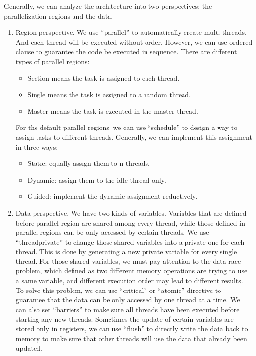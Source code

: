 {Generally, we can analyze the architecture into two perspectives: the parallelization regions and the data.
\begin{enumerate}
	\item Region perspective.
	We use “parallel” to automatically create multi-threads. And each thread will be executed without order. However, we can use ordered clause to guarantee the code be executed in sequence. There are different types of parallel regions:
	\begin{itemize}
		\item Section means the task is assigned to each thread.
		\item Single means the task is assigned to a random thread.
		\item Master means the task is executed in the master thread.
	\end{itemize}
	For the default parallel regions, we can use “schedule” to design a way to assign tasks to different threads. Generally, we can implement this assignment in three ways:
	\begin{itemize}
		\item Static: equally assign them to n threads.
		\item Dynamic: assign them to the idle thread only.
		\item Guided: implement the dynamic assignment reductively.
	\end{itemize}
	\item Data perspective.
	We have two kinds of variables. Variables that are defined before parallel region are shared among every thread, while those defined in parallel regions can be only accessed by certain threads. We use “threadprivate” to change those shared variables into a private one for each thread. This is done by generating a new private variable for every single thread. For those shared variables, we must pay attention to the data race problem, which defined as two different memory operations are trying to use a same variable, and different execution order may lead to different results. To solve this problem, we can use “critical” or “atomic” directive to guarantee that the data can be only accessed by one thread at a time. We can also set “barriers” to make sure all threads have been executed before starting any new threads. Sometimes the update of certain variables are stored only in registers, we can use “flush” to directly write the data back to memory to make sure that other threads will use the data that already been updated.
\end{enumerate}
}
